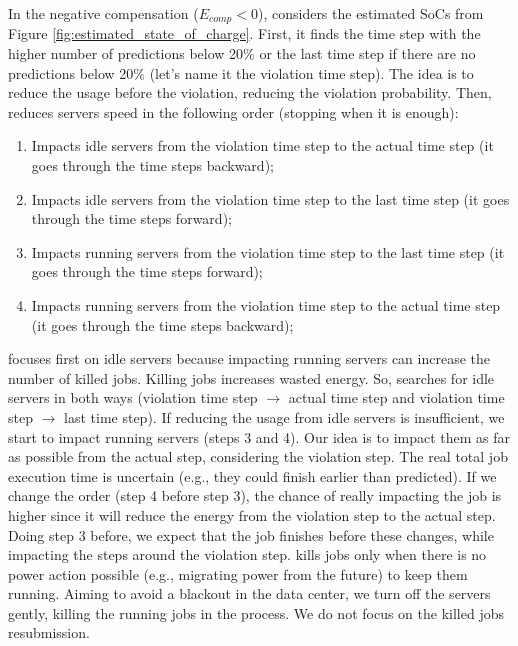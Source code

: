 In the negative compensation ($E_{comp}<0$), \emph{\systemName} considers the estimated SoCs from Figure \ref{fig:estimated_state_of_charge}. First, it finds the time step with the higher number of predictions below 20\% or the last time step if there are no predictions below 20\% (let's name it the violation time step). The idea is to reduce the usage before the violation, reducing the violation probability. Then, \emph{\systemName} reduces servers speed in the following order (stopping when it is enough):
\begin{enumerate}
    \item Impacts idle servers from the violation time step to the actual time step (it goes through the time steps backward);
    \item Impacts idle servers from the violation time step to the last time step (it goes through the time steps forward);
    \item Impacts running servers from the violation time step to the last time step (it goes through the time steps forward);
    \item Impacts running servers from the violation time step to the actual time step (it goes through the time steps backward);
\end{enumerate}

\emph{\systemName} focuses first on idle servers because impacting running servers can increase the number of killed jobs. Killing jobs increases wasted energy. So, \emph{\systemName} searches for idle servers in both ways (violation time step $\rightarrow$ actual time step and violation time step $\rightarrow$ last time step). If reducing the usage from idle servers is insufficient, we start to impact running servers (steps 3 and 4). Our idea is to impact them as far as possible from the actual step, considering the violation step. The real total job execution time is uncertain (e.g., they could finish earlier than predicted). If we change the order (step 4 before step 3), the chance of really impacting the job is higher since it will reduce the energy from the violation step to the actual step. Doing step 3 before, we expect that the job finishes before these changes, while impacting the steps around the violation step. \emph{\systemName} kills jobs only when there is no power action possible (e.g., migrating power from the future) to keep them running. Aiming to avoid a blackout in the data center, we turn off the servers gently, killing the running jobs in the process. We do not focus on the killed jobs resubmission.


